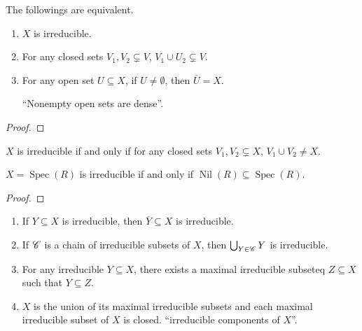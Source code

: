 \begin{lemma}
    The followings are equivalent.
    \begin{enumerate}
        \item $X$ is irreducible.
        \item For any closed sets $V_1,V_2 \subsetneq V$, $V_1 \cup U_2 \subsetneq V$.
        \item For any open set $U \subseteq X$, if $U \neq \emptyset$, then $\overbar U = X$. \par 
            ``Nonempty open sets are dense''.
    \end{enumerate}
\end{lemma}

\begin{proof}

\end{proof}

\begin{lemma}
    $X$ is irreducible if and only if for any closed sets $V_1,V_2 \subsetneq X$, $V_1 \cup V_2 \neq X$.
\end{lemma}

\begin{proposition}
    $X = \operatorname{Spec}(R)$ is irreducible if and only if $\operatorname{Nil}(R) \subseteq \operatorname{Spec}(R)$. 
\end{proposition}

\begin{proof}

\end{proof}

\begin{proposition}
    \begin{enumerate}
        \item If $Y \subseteq X$ is irreducible, then $\overbar Y \subseteq X$ is irreducible.
        \item If $\mathscr{C}$ is a chain of irreducible subsets of $X$, then $\bigcup_{Y \in \mathscr{C}}Y$ is irreducible.
        \item For any irreducible $Y \subseteq X$, there exists a maximal irreducible subseteq $Z \subseteq X$ such that $Y \subseteq Z$.
        \item $X$ is the union of its maximal irreducible subsets and each maximal irreducible subset of $X$ is closed. ``irreducible components of $X$''.
    \end{enumerate}
\end{proposition}

